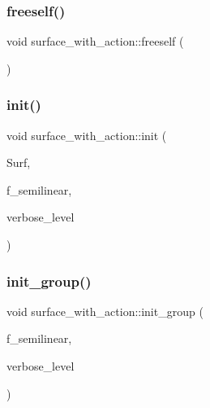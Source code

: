 \mbox{\label{classsurface__with__action_a51a00cbb190080e05ff446634023a454}} 
\subsubsection{\texorpdfstring{freeself()}{freeself()}}
{\footnotesize\ttfamily void surface\+\_\+with\+\_\+action\+::freeself (\begin{DoxyParamCaption}{ }\end{DoxyParamCaption})}

\mbox{\label{classsurface__with__action_a8e716ca96b2dd1833dbbb0e3711b9435}} 
\subsubsection{\texorpdfstring{init()}{init()}}
{\footnotesize\ttfamily void surface\+\_\+with\+\_\+action\+::init (\begin{DoxyParamCaption}\item[{\mbox{\hyperlink{classsurface}{surface}} $\ast$}]{Surf,  }\item[{\mbox{\hyperlink{galois_8h_a09fddde158a3a20bd2dcadb609de11dc}{I\+NT}}}]{f\+\_\+semilinear,  }\item[{\mbox{\hyperlink{galois_8h_a09fddde158a3a20bd2dcadb609de11dc}{I\+NT}}}]{verbose\+\_\+level }\end{DoxyParamCaption})}

\mbox{\label{classsurface__with__action_a8fc5e9fd211eaca0a5e4a922aa515d8b}} 
\subsubsection{\texorpdfstring{init\+\_\+group()}{init\_group()}}
{\footnotesize\ttfamily void surface\+\_\+with\+\_\+action\+::init\+\_\+group (\begin{DoxyParamCaption}\item[{\mbox{\hyperlink{galois_8h_a09fddde158a3a20bd2dcadb609de11dc}{I\+NT}}}]{f\+\_\+semilinear,  }\item[{\mbox{\hyperlink{galois_8h_a09fddde158a3a20bd2dcadb609de11dc}{I\+NT}}}]{verbose\+\_\+level }\end{DoxyParamCaption})}

